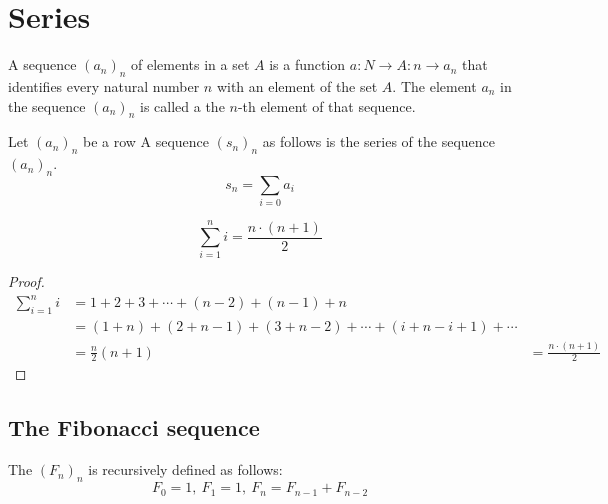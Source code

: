 \documentclass[main.tex]{subfiles}
\begin{document}
\chapter{Series}

\begin{de}
    A sequence $(a_{n})_{n}$ of elements in a set $A$ is a function $a: N
    \rightarrow A: n \rightarrow a_{n}$ that identifies every natural number $n$ with an element of
    the set $A$. The element $a_{n}$ in the sequence $(a_{n})_{n}$ is called a the
    $n$-th element of that sequence.
\end{de}

\begin{de}
    Let $(a_{n})_{n}$ be a row
    A sequence $(s_{n})_{n}$ as follows is the series of the sequence $(a_{n})_{n}$.
    \[ s_{n} = \sum_{i=0}a_{i} \]
\end{de}

\begin{pr}
    \label{pr:sum-of-first-n-natural-numbers}
    \[
        \sum_{i=1}^n i = \frac{n\cdot(n+1)}{2}
    \]
    \begin{proof}
        \begin{align*}
            \sum_{i=1}^n i
            &= 1 + 2 + 3 + \dotsb + (n-2) + (n-1) + n\\
            &= (1 + n) + (2+n-1) + (3+n-2) + \dotsb + (i+n-i+1) + \dotsb\\
            &= \frac{n}{2} (n+1)
            &= \frac{n\cdot(n+1)}{2}
        \end{align*}
    \end{proof}
\end{pr}

\section{The Fibonacci sequence}
\begin{de}
  The  $(F_{n})_{n}$ is recursively defined as follows:
  \[ F_{0} = 1,\ F_{1} = 1,\ F_{n} = F_{n-1} + F_{n-2} \]
\end{de}
\end{document}
